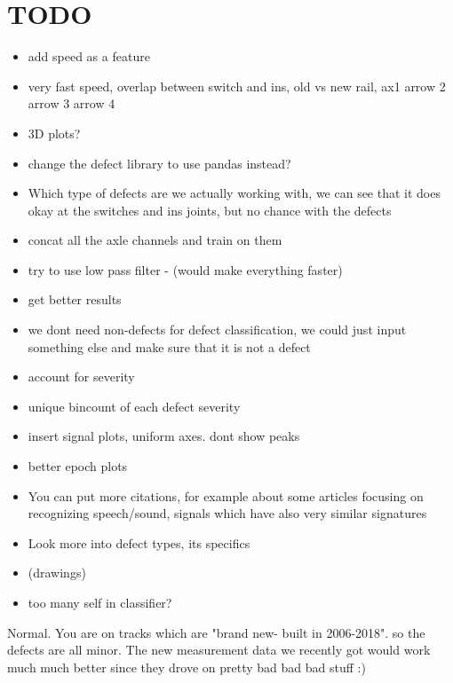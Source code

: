 \section{TODO}
\begin{itemize}
	\item add speed as a feature
	\item very fast speed, overlap between switch and ins, old vs new rail, ax1 arrow 2 arrow 3 arrow 4
	\item 3D plots?
	\item change the defect library to use pandas instead?
	\item Which type of defects are we actually working with, we can see that it does okay at the switches and ins joints, but no chance with the defects
	\item concat all the axle channels and train on them
	\item try to use low pass filter - (would make everything faster)
	\item get better results
	\item we dont need non-defects for defect classification, we could just input something else and make sure that it is not a defect
	\item account for severity
	\item unique bincount of each defect severity
	\item insert signal plots, uniform axes. dont show peaks
	\item better epoch plots
	\item You can put more citations, for example about some articles focusing on recognizing speech/sound, signals which have also very similar signatures
	\item Look more into defect types, its specifics
	\item (drawings)
	\item too many self in classifier?
\end{itemize}
Normal. You are on tracks which are "brand new- built in 2006-2018".  so the defects are all minor. The new measurement data we recently got would work much much better since they drove on pretty bad bad bad stuff :)

